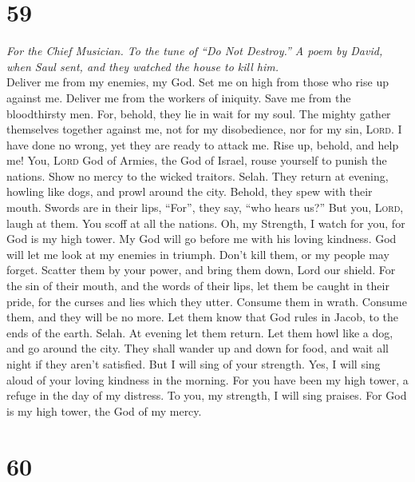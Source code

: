 \hypertarget{section-58}{%
\section{59}\label{section-58}}

\emph{For the Chief Musician. To the tune of ``Do Not Destroy.'' A poem
by David, when Saul sent, and they watched the house to kill him.}\\
 Deliver me from my enemies, my God. Set me on high from
those who rise up against me.  Deliver me from the workers
of iniquity. Save me from the bloodthirsty men.  For,
behold, they lie in wait for my soul. The mighty gather themselves
together against me, not for my disobedience, nor for my sin,
\textsc{Lord}.  I have done no wrong, yet they are ready
to attack me. Rise up, behold, and help me!  You,
\textsc{Lord} God of Armies, the God of Israel, rouse yourself to punish
the nations. Show no mercy to the wicked traitors. Selah. 
They return at evening, howling like dogs, and prowl around the city.
 Behold, they spew with their mouth. Swords are in their
lips, ``For'', they say, ``who hears us?''  But you,
\textsc{Lord}, laugh at them. You scoff at all the nations.
 Oh, my Strength, I watch for you, for God is my high
tower.  My God will go before me with his loving
kindness. God will let me look at my enemies in triumph. 
Don't kill them, or my people may forget. Scatter them by your power,
and bring them down, Lord our shield.  For the sin of
their mouth, and the words of their lips, let them be caught in their
pride, for the curses and lies which they utter.  Consume
them in wrath. Consume them, and they will be no more. Let them know
that God rules in Jacob, to the ends of the earth. Selah.
 At evening let them return. Let them howl like a dog,
and go around the city.  They shall wander up and down
for food, and wait all night if they aren't satisfied. 
But I will sing of your strength. Yes, I will sing aloud of your loving
kindness in the morning. For you have been my high tower, a refuge in
the day of my distress.  To you, my strength, I will sing
praises. For God is my high tower, the God of my mercy.

\hypertarget{section-59}{%
\section{60}\label{section-59}}

